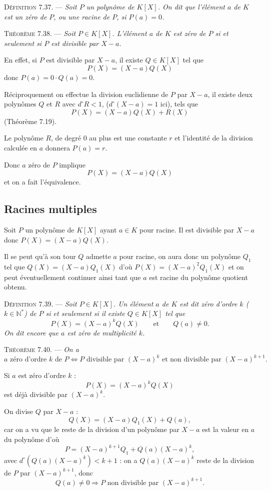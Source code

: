 
\medskip\noindent\textsc{Définition 7.37.} --- \emph{Soit $P$ un polynôme de $K[X]$. On dit que l'élément $a$ de $K$ est un zéro de $P$, ou une racine de $P$, si $P(a)=0$.}

\medskip\noindent\textsc{Théorème 7.38.} --- \emph{Soit $P\in K[X]$. L'élément $a$ de $K$ est zéro de $P$ si et seulement si $P$ est divisible par $X-a$.}

En effet, si $P$ est divisible par $X-a$, il existe $Q\in K[X]$ tel que
\[
P(X)=(X-a)Q(X)
\]
donc $P(a)=0\cdot Q(a)=0$.

Réciproquement on effectue la division euclidienne de $P$ par $X-a$, il existe deux polynômes $Q$ et $R$ avec $d^\circ R<1$, ($d^\circ(X-a)=1$ ici), tels que
\[
P(X)=(X-a)Q(X)+R(X)
\]
(Théorème 7.19).

Le polynôme $R$, de degré 0 au plus est une constante $r$ et l'identité de la division calculée en $a$ donnera $P(a)=r$.

Donc $a$ zéro de $P$ implique
\[
P(X)=(X-a)Q(X)
\]
et on a fait l'équivalence. \bookend

\subsection*{Racines multiples}

Soit $P$ un polynôme de $K[X]$ ayant $a\in K$ pour racine. Il est divisible par $X-a$ donc $P(X)=(X-a)Q(X)$.

Il se peut qu'à son tour $Q$ admette $a$ pour racine, on aura donc un polynôme $Q_1$ tel que $Q(X)=(X-a)Q_1(X)$ d'où $P(X)=(X-a)^2Q_1(X)$ et on peut éventuellement continuer ainsi tant que $a$ est racine du polynôme quotient obtenu.

\medskip\noindent\textsc{Définition 7.39.} --- \emph{Soit $P\in K[X]$. Un élément $a$ de $K$ est dit zéro d'ordre $k$ ($k\in\mathbb N^*$) de $P$ si et seulement si il existe $Q\in K[X]$ tel que
\[
P(X)=(X-a)^kQ(X)\qquad\text{et}\qquad Q(a)\ne0.
\]
On dit encore que $a$ est zéro de multiplicité $k$.}

\medskip\noindent\textsc{Théorème 7.40.} --- \emph{On a
\[
a\text{ zéro d'ordre }k\text{ de }P\Longleftrightarrow P\text{ divisible par }(X-a)^k\text{ et non divisible par }(X-a)^{k+1}.
\]}

Si $a$ est zéro d'ordre $k$ :
\[
P(X)=(X-a)^kQ(X)
\]
est déjà divisible par $(X-a)^k$.

On divise $Q$ par $X-a$ :
\[
Q(X)=(X-a)Q_1(X)+Q(a),
\]
car on a vu que le reste de la division d'un polynôme par $X-a$ est la valeur en $a$ du polynôme d'où
\[
P=(X-a)^{k+1}Q_1+Q(a)(X-a)^k,
\]
avec $d^\circ(Q(a)(X-a)^k)<k+1$ : on a $Q(a)(X-a)^k$ reste de la division de $P$ par $(X-a)^{k+1}$, donc
\[
Q(a)\ne0\Rightarrow P\text{ non divisible par }(X-a)^{k+1}.
\]

